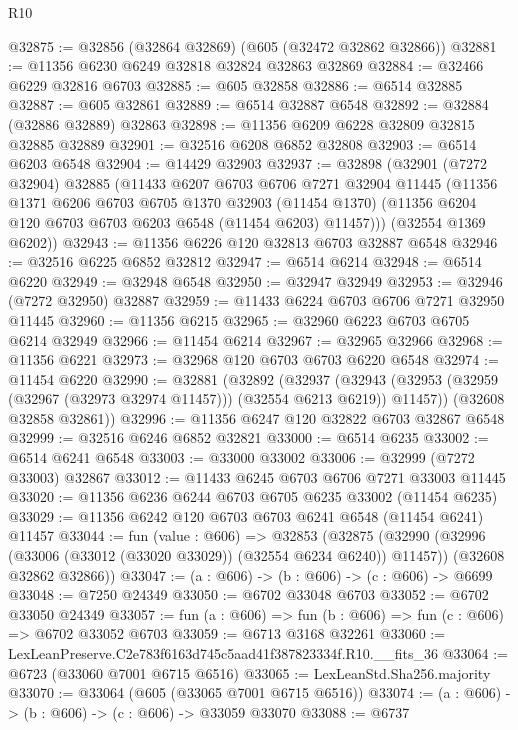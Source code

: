 \begin{lexlean}{R10}
\begin{coremodule}
@32875 := @32856 (@32864 @32869) (@605 (@32472 @32862 @32866))
@32881 := @11356 @6230 @6249 @32818 @32824 @32863 @32869
@32884 := @32466 @6229 @32816 @6703
@32885 := @605 @32858
@32886 := @6514 @32885
@32887 := @605 @32861
@32889 := @6514 @32887 @6548
@32892 := @32884 (@32886 @32889) @32863
@32898 := @11356 @6209 @6228 @32809 @32815 @32885 @32889
@32901 := @32516 @6208 @6852 @32808
@32903 := @6514 @6203 @6548
@32904 := @14429 @32903
@32937 := @32898
    (@32901
      (@7272 @32904)
      @32885
      (@11433
        @6207
        @6703
        @6706
        @7271
        @32904
        @11445
        (@11356
          @1371
          @6206
          @6703
          @6705
          @1370
          @32903
          (@11454 @1370)
          (@11356 @6204 @120 @6703 @6703 @6203 @6548 (@11454 @6203) @11457)))
      (@32554 @1369 @6202))
@32943 := @11356 @6226 @120 @32813 @6703 @32887 @6548
@32946 := @32516 @6225 @6852 @32812
@32947 := @6514 @6214
@32948 := @6514 @6220
@32949 := @32948 @6548
@32950 := @32947 @32949
@32953 := @32946 (@7272 @32950) @32887
@32959 := @11433 @6224 @6703 @6706 @7271 @32950 @11445
@32960 := @11356 @6215
@32965 := @32960 @6223 @6703 @6705 @6214 @32949
@32966 := @11454 @6214
@32967 := @32965 @32966
@32968 := @11356 @6221
@32973 := @32968 @120 @6703 @6703 @6220 @6548
@32974 := @11454 @6220
@32990 := @32881
    (@32892
      (@32937
        (@32943 (@32953 (@32959 (@32967 (@32973 @32974 @11457))) (@32554 @6213 @6219)) @11457))
      (@32608 @32858 @32861))
@32996 := @11356 @6247 @120 @32822 @6703 @32867 @6548
@32999 := @32516 @6246 @6852 @32821
@33000 := @6514 @6235
@33002 := @6514 @6241 @6548
@33003 := @33000 @33002
@33006 := @32999 (@7272 @33003) @32867
@33012 := @11433 @6245 @6703 @6706 @7271 @33003 @11445
@33020 := @11356 @6236 @6244 @6703 @6705 @6235 @33002 (@11454 @6235)
@33029 := @11356 @6242 @120 @6703 @6703 @6241 @6548 (@11454 @6241) @11457
@33044 := fun (value : @606) =>
  @32853
    (@32875
      (@32990 (@32996 (@33006 (@33012 (@33020 @33029)) (@32554 @6234 @6240)) @11457))
      (@32608 @32862 @32866))
@33047 := (a : @606) -> (b : @606) -> (c : @606) -> @6699
@33048 := @7250 @24349
@33050 := @6702 @33048 @6703
@33052 := @6702 @33050 @24349
@33057 := fun (a : @606) => fun (b : @606) => fun (c : @606) => @6702 @33052 @6703
@33059 := @6713 @3168 @32261
@33060 := LexLeanPreserve.C2e783f6163d745c5aad41f387823334f.R10.__fits_36
@33064 := @6723 (@33060 @7001 @6715 @6516)
@33065 := LexLeanStd.Sha256.majority
@33070 := @33064 (@605 (@33065 @7001 @6715 @6516))
@33074 := (a : @606) -> (b : @606) -> (c : @606) -> @33059 @33070
@33088 := @6737

\end{coremodule}
\end{lexlean}
